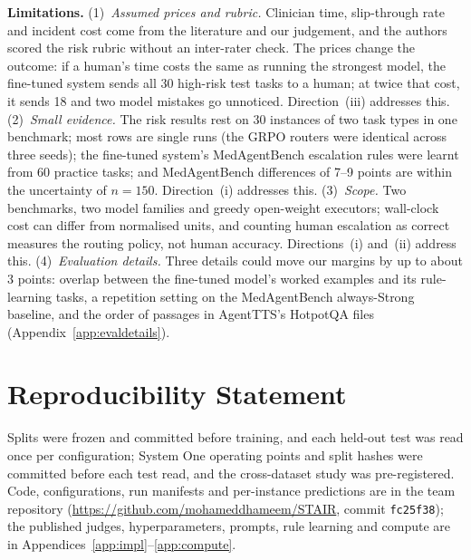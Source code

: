 \documentclass{article}
\begin{document}
\textbf{Limitations.} (1)~\emph{Assumed prices and rubric.} Clinician time, slip-through rate and incident cost come from the literature and our judgement, and the authors scored the risk rubric without an inter-rater check. The prices change the outcome: if a human's time costs the same as running the strongest model, the fine-tuned system sends all 30 high-risk test tasks to a human; at twice that cost, it sends 18 and two model mistakes go unnoticed. Direction~(iii) addresses this. (2)~\emph{Small evidence.} The risk results rest on 30 instances of two task types in one benchmark; most rows are single runs (the GRPO routers were identical across three seeds); the fine-tuned system's MedAgentBench escalation rules were learnt from 60 practice tasks; and MedAgentBench differences of 7--9 points are within the uncertainty of $n{=}150$. Direction~(i) addresses this. (3)~\emph{Scope.} Two benchmarks, two model families and greedy open-weight executors; wall-clock cost can differ from normalised units, and counting human escalation as correct measures the routing policy, not human accuracy. Directions~(i) and~(ii) address this. (4)~\emph{Evaluation details.} Three details could move our margins by up to about 3 points: overlap between the fine-tuned model's worked examples and its rule-learning tasks, a repetition setting on the MedAgentBench always-Strong baseline, and the order of passages in AgentTTS's HotpotQA files (Appendix~\ref{app:evaldetails}).

\section*{Reproducibility Statement}

Splits were frozen and committed before training, and each held-out test was read once per configuration; System One operating points and split hashes were committed before each test read, and the cross-dataset study was pre-registered. Code, configurations, run manifests and per-instance predictions are in the team repository (\url{https://github.com/mohameddhameem/STAIR}, commit \texttt{fc25f38}); the published judges, hyperparameters, prompts, rule learning and compute are in Appendices~\ref{app:impl}--\ref{app:compute}.




\newpage
\appendix
\end{document}
